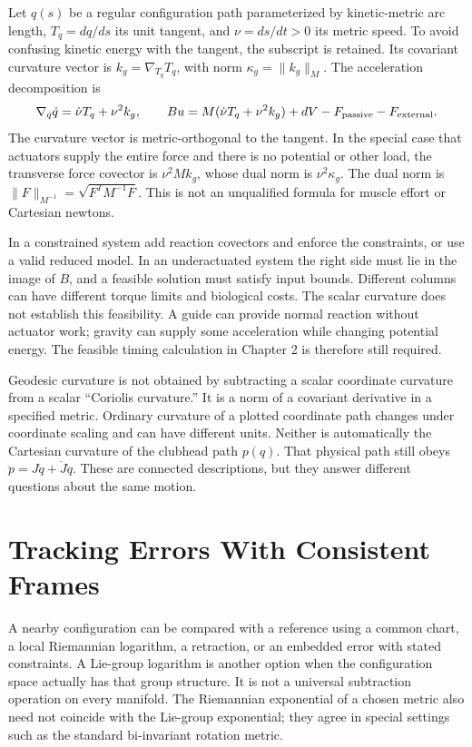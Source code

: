 Let $q(s)$ be a regular configuration path parameterized by kinetic-metric
arc length, $T_q=dq/ds$ its unit tangent, and $\nu=ds/dt>0$ its metric speed.
To avoid confusing kinetic energy with the tangent, the subscript is retained.
Its covariant curvature vector is $k_g=\nabla_{T_q}T_q$, with norm
$\kappa_g=\|k_g\|_M$. The acceleration decomposition is
\begin{equation}\label{eq:manifold_path_force}
 \nabla_{\dot q}\dot q=\dot\nu T_q+\nu^2 k_g,\qquad
 B u=M(\dot\nu T_q+\nu^2 k_g)+dV-F_{\rm passive}-F_{\rm external}.
\end{equation}
The curvature vector is metric-orthogonal to the tangent. In the special
case that actuators supply the entire force and there is no potential or
other load, the transverse force covector is $\nu^2 M k_g$, whose dual norm
is $\nu^2\kappa_g$. The dual norm is $\|F\|_{M^{-1}}=\sqrt{F^TM^{-1}F}$.
This is not an unqualified formula for muscle effort or Cartesian newtons.

In a constrained system add reaction covectors and enforce the constraints,
or use a valid reduced model. In an underactuated system the right side must
lie in the image of $B$, and a feasible solution must satisfy input bounds.
Different columns can have different torque limits and biological costs.
The scalar curvature does not establish this feasibility. A guide can provide
normal reaction without actuator work; gravity can supply some acceleration
while changing potential energy. The feasible timing calculation in Chapter 2
is therefore still required.

Geodesic curvature is not obtained by subtracting a scalar coordinate curvature
from a scalar ``Coriolis curvature.'' It is a norm of a covariant derivative
in a specified metric. Ordinary curvature of a plotted coordinate path changes
under coordinate scaling and can have different units. Neither is automatically
the Cartesian curvature of the clubhead path $p(q)$. That physical path still
obeys $\ddot p=J\ddot q+\dot J\dot q$. These are connected descriptions,
but they answer different questions about the same motion.

\section{Tracking Errors With Consistent Frames}

A nearby configuration can be compared with a reference using a common chart,
a local Riemannian logarithm, a retraction, or an embedded error with stated
constraints. A Lie-group logarithm is another option when the configuration
space actually has that group structure. It is not a universal subtraction
operation on every manifold. The Riemannian exponential of a chosen metric
also need not coincide with the Lie-group exponential; they agree in special
settings such as the standard bi-invariant rotation metric.

